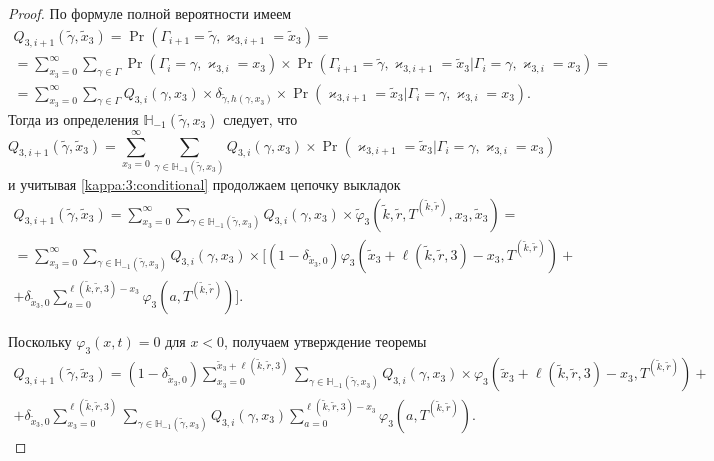 \documentclass[a4paper,12pt,russian]{extarticle}
\begin{document}
\begin{proof}
По формуле полной вероятности имеем
\begin{multline*}
Q_{3,i+1}(\tilde{\gamma},\tilde{x}_3) = \Pr(\Gamma_{i+1}=\tilde{\gamma}, \varkappa_{3,i+1}=\tilde{x}_3) = \\
= \sum_{x_3=0}^{\infty}\sum_{\gamma \in \Gamma} \Pr(\Gamma_{i}=\gamma, \varkappa_{3,i}=x_3) \times \Pr(\Gamma_{i+1}=\tilde{\gamma}, \varkappa_{3,i+1}=\tilde{x}_3 | \Gamma_{i}=\gamma, \varkappa_{3,i}=x_3) =  \\ 
= \sum_{x_3=0}^{\infty}\sum_{\gamma \in \Gamma} Q_{3,i}(\gamma,x_3) \times \delta_{\tilde{\gamma},h(\gamma,x_3)}\times
\Pr(\varkappa_{3,i+1}=\tilde{x}_3 | \Gamma_{i}=\gamma, \varkappa_{3,i}=x_3).
\end{multline*}
Тогда из определения $ {\mathbb H}_{-1}(\tilde{\gamma},x_3)$ следует, что 
\begin{equation*}
Q_{3,i+1}(\tilde{\gamma},\tilde{x}_3) =\sum_{x_3=0}^{\infty}\sum_{\gamma \in {\mathbb H}_{-1}(\tilde{\gamma},x_3)} Q_{3,i}(\gamma,x_3) \times 
\Pr(\varkappa_{3,i+1}=\tilde{x}_3 | \Gamma_{i}=\gamma, \varkappa_{3,i}=x_3)
\end{equation*}
и учитывая \eqref{kappa:3:conditional} продолжаем цепочку выкладок
\begin{multline*}
Q_{3,i+1}(\tilde{\gamma},\tilde{x}_3)= \sum_{x_3=0}^{\infty}\sum_{\gamma \in {\mathbb H}_{-1}(\tilde{\gamma},x_3)} Q_{3,i}(\gamma,x_3) \times 
\tilde{\varphi}_3(\tilde{k},\tilde{r}, T^{(\tilde{k},\tilde{r})},x_3,\tilde{x}_3) = \\
= \sum_{x_3=0}^{\infty}\sum_{\gamma \in {\mathbb H}_{-1}(\tilde{\gamma},x_3)} Q_{3,i}(\gamma,x_3) \times 
[ (1-\delta_{\tilde{x}_3,0})\varphi_3(\tilde{x}_3 + \ell(\tilde{k},\tilde{r},3) - x_3,T^{(\tilde{k},\tilde{r})}) + \\ 
+\delta_{\tilde{x}_3,0} \sum_{a=0}^{\ell(\tilde{k},\tilde{r},3)-x_3}\varphi_3(a,T^{(\tilde{k},\tilde{r})})].
\end{multline*}

Поскольку  $\varphi_3(x,t)=0$ для $x<0$, получаем утверждение теоремы
\begin{multline*}
Q_{3,i+1}(\tilde{\gamma},\tilde{x}_3)= (1-\delta_{\tilde{x}_3,0}) \sum_{x_3=0}^{\tilde{x}_3 +  \ell(\tilde{k},\tilde{r},3)}\sum_{\gamma \in {\mathbb H}_{-1}(\tilde{\gamma},x_3)} Q_{3,i}(\gamma,x_3) \times 
\varphi_3(\tilde{x}_3 + \ell(\tilde{k},\tilde{r},3) - x_3,T^{(\tilde{k},\tilde{r})}) + \\
+ \delta_{\tilde{x}_3,0} \sum_{x_3=0}^{\ell(\tilde{k},\tilde{r},3)}\sum_{\gamma \in {\mathbb H}_{-1}(\tilde{\gamma},x_3)} Q_{3,i}(\gamma,x_3) \sum_{a=0}^{\ell(\tilde{k},\tilde{r},3) - x_3} \varphi_3(a,T^{(\tilde{k},\tilde{r})}).
\end{multline*}
\end{proof}
\end{document}
